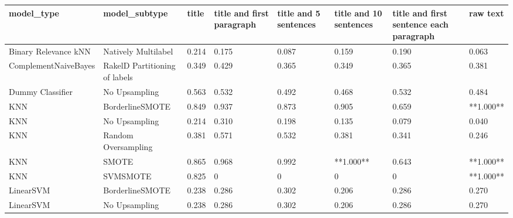 \begin{tabular}{llllllll}
\toprule
                     model\_type &                 model\_subtype & title & title and first paragraph & title and 5 sentences & title and 10 sentences & title and first sentence each paragraph &  raw text \\
\midrule
           Binary Relevance kNN &           Natively Multilabel & 0.214 &                     0.175 &                 0.087 &                  0.159 &                                   0.190 &     0.063 \\
           ComplementNaiveBayes & RakelD Partitioning of labels & 0.349 &                     0.429 &                 0.365 &                  0.349 &                                   0.365 &     0.381 \\
               Dummy Classifier &                 No Upsampling & 0.563 &                     0.532 &                 0.492 &                  0.468 &                                   0.532 &     0.484 \\
                            KNN &               BorderlineSMOTE & 0.849 &                     0.937 &                 0.873 &                  0.905 &                                   0.659 & **1.000** \\
                            KNN &                 No Upsampling & 0.214 &                     0.310 &                 0.198 &                  0.135 &                                   0.079 &     0.040 \\
                            KNN &           Random Oversampling & 0.381 &                     0.571 &                 0.532 &                  0.381 &                                   0.341 &     0.246 \\
                            KNN &                         SMOTE & 0.865 &                     0.968 &                 0.992 &              **1.000** &                                   0.643 & **1.000** \\
                            KNN &                      SVMSMOTE & 0.825 &                         0 &                     0 &                      0 &                                       0 & **1.000** \\
                      LinearSVM &               BorderlineSMOTE & 0.238 &                     0.286 &                 0.302 &                  0.206 &                                   0.286 &     0.270 \\
                      LinearSVM &                 No Upsampling & 0.238 &                     0.286 &                 0.302 &                  0.206 &                                   0.286 &     0.270 \\

\end{tabular}
